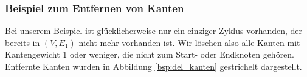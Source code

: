 \subsubsection{Beispiel zum Entfernen von Kanten}

Bei unserem Beispiel ist glücklicherweise nur ein einziger Zyklus vorhanden, der bereits in $(V,E_1)$ nicht mehr vorhanden ist. Wir löschen also alle Kanten mit Kantengewicht 1 oder weniger, die nicht zum Start- oder Endknoten gehören. Entfernte Kanten wurden in Abbildung \ref{bsp:del_kanten} gestrichelt dargestellt.   

\begin{figure}
\begin{center}
	\begin{tikzpicture}[
	mycircle/.style={
		circle,
		draw=black,
		fill opacity = 0.3,
		text opacity=1,
		inner sep=0pt,
		minimum size=15pt,
		font=\tiny},
	myarrow/.style={-Stealth},
	node distance=0.6cm and 1.1cm
	]
	

\end{tikzpicture}
\end{center}
\end{figure}
